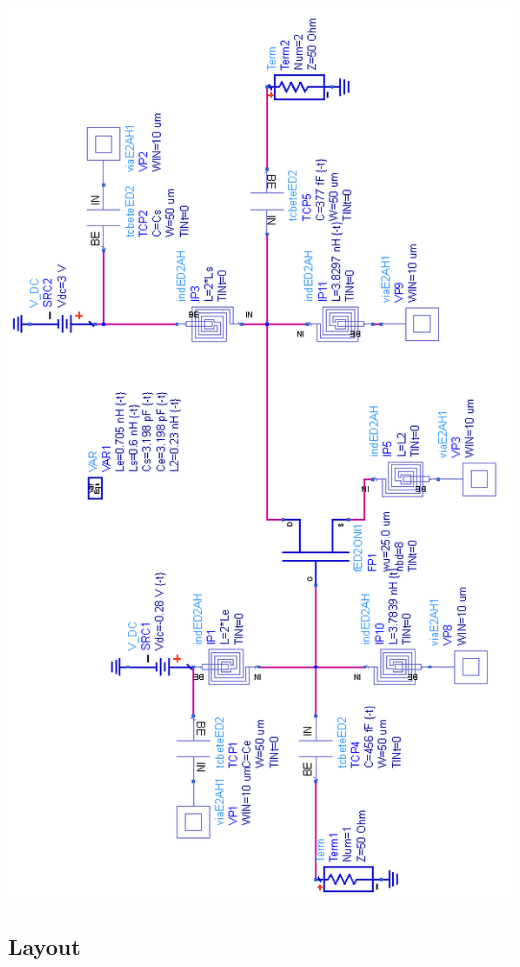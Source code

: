 \documentclass{article}
\begin{document}
\begin{centering}
\includegraphics[width=14cm]{simpli_schema.png}

\subsection{Layout}


\end{centering}
\end{document}
